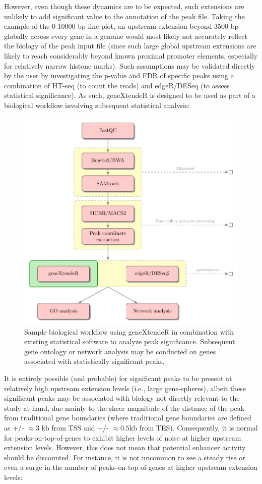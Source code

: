 \documentclass[12pt]{article}
\begin{document}
However, even though these dynamics are to be expected, such extensions are unlikely to add significant value to the annotation of the peak file.  Taking the example of the 0-10000 bp line plot, an upstream extension beyond 3500 bp globally across every gene in a genome would most likely not accurately reflect the biology of the peak input file (since such large global upstream extensions are likely to reach considerably beyond known proximal promoter elements, especially for relatively narrow histone marks).  Such assumptions may be validated directly by the user by investigating the p-value and FDR of specific peaks using a combination of HT-seq (to count the reads) and edgeR/DESeq (to assess statistical significance).  As such, geneXtendeR is designed to be used as part of a biological workflow involving subsequent statistical analysis:

\begin{figure}[H]
\centering
\includegraphics{figures/workflow.pdf}
\caption{Sample biological workflow using geneXtendeR in combination with existing statistical software to analyze peak significance.  Subsequent gene ontology or network analysis may be conducted on genes associated with statistically significant peaks.}
\end{figure}

It is entirely possible (and probable) for significant peaks to be present at relatively high upstream extension levels (i.e., large gene-spheres), albeit these significant peaks may be associated with biology not directly relevant to the study at-hand, due mainly to the sheer magnitude of the distance of the peak from traditional gene boundaries (where traditional gene boundaries are defined as +/- $\approx 3$ kb from TSS and +/- $\approx 0.5$kb from TES).  Consequently, it is normal for peaks-on-top-of-genes to exhibit higher levels of noise at higher upstream extension levels.  However, this does not mean that potential enhancer activity should be discounted.  For instance, it is not uncommon to see a steady rise or even a surge in the number of peaks-on-top-of-genes at higher upstream extension levels:
\end{document}
